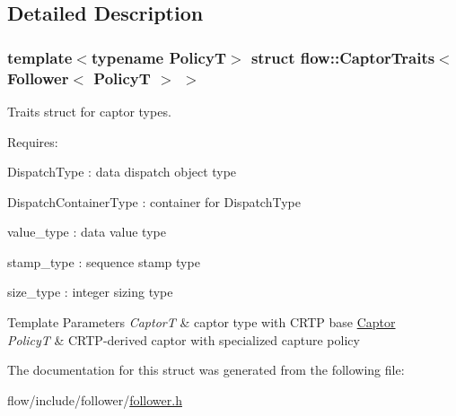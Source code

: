 \subsection{Detailed Description}
\subsubsection*{template$<$typename PolicyT$>$\newline
struct flow\+::\+Captor\+Traits$<$ Follower$<$ Policy\+T $>$ $>$}

Traits struct for captor types. 

Requires\+:
\begin{DoxyItemize}
\item {\ttfamily Dispatch\+Type} \+: data dispatch object type
\item {\ttfamily Dispatch\+Container\+Type} \+: container for {\ttfamily Dispatch\+Type}
\item {\ttfamily value\+\_\+type} \+: data value type
\item {\ttfamily stamp\+\_\+type} \+: sequence stamp type
\item {\ttfamily size\+\_\+type} \+: integer sizing type
\end{DoxyItemize}


\begin{DoxyTemplParams}{Template Parameters}
{\em CaptorT} & captor type with C\+R\+TP base {\ttfamily \hyperlink{classflow_1_1_captor}{Captor}} \\
\hline
{\em PolicyT} & C\+R\+T\+P-\/derived captor with specialized capture policy \\
\hline
\end{DoxyTemplParams}


The documentation for this struct was generated from the following file\+:\begin{DoxyCompactItemize}
\item 
flow/include/follower/\hyperlink{follower_8h}{follower.\+h}\end{DoxyCompactItemize}
